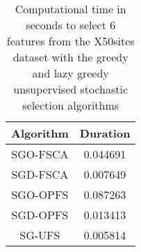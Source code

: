 \begin{table}
	\begin{center}
		\begin{tabular}{c c}
			Algorithm & Duration \\
			\hline
			SGO-FSCA & 0.044691 \\
			SGD-FSCA & 0.007649 \\
			SGO-OPFS & 0.087263 \\
			SGD-OPFS & 0.013413 \\
			SG-UFS & 0.005814 \\
		\end{tabular}
	\end{center}
	\caption{Computational time in seconds to select 6 features from the X50sites dataset with the greedy and lazy greedy unsupervised stochastic selection algorithms}
\end{table}